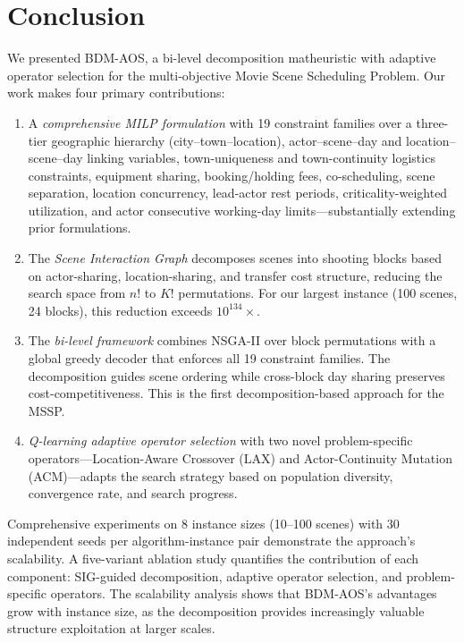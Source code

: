 \section{Conclusion}
\label{sec:conclusion}

We presented BDM-AOS, a bi-level decomposition matheuristic with adaptive operator selection for the multi-objective Movie Scene Scheduling Problem.
Our work makes four primary contributions:

\begin{enumerate}
    \item A \emph{comprehensive MILP formulation} with 19 constraint families over a three-tier geographic hierarchy (city--town--location), actor--scene--day and location--scene--day linking variables, town-uniqueness and town-continuity logistics constraints, equipment sharing, booking/holding fees, co-scheduling, scene separation, location concurrency, lead-actor rest periods, criticality-weighted utilization, and actor consecutive working-day limits---substantially extending prior formulations.

    \item The \emph{Scene Interaction Graph} decomposes scenes into shooting blocks based on actor-sharing, location-sharing, and transfer cost structure, reducing the search space from $n!$ to $K!$ permutations.
    For our largest instance (100 scenes, 24 blocks), this reduction exceeds $10^{134}\times$.

    \item The \emph{bi-level framework} combines NSGA-II over block permutations with a global greedy decoder that enforces all 19 constraint families. The decomposition guides scene ordering while cross-block day sharing preserves cost-competitiveness. This is the first decomposition-based approach for the MSSP.

    \item \emph{Q-learning adaptive operator selection} with two novel problem-specific operators---Location-Aware Crossover (LAX) and Actor-Continuity Mutation (ACM)---adapts the search strategy based on population diversity, convergence rate, and search progress.
\end{enumerate}

Comprehensive experiments on 8 instance sizes (10--100 scenes) with 30 independent seeds per algorithm-instance pair demonstrate the approach's scalability.
A five-variant ablation study quantifies the contribution of each component:
SIG-guided decomposition, adaptive operator selection, and problem-specific operators.
The scalability analysis shows that BDM-AOS's advantages grow with instance size, as the decomposition provides increasingly valuable structure exploitation at larger scales.

